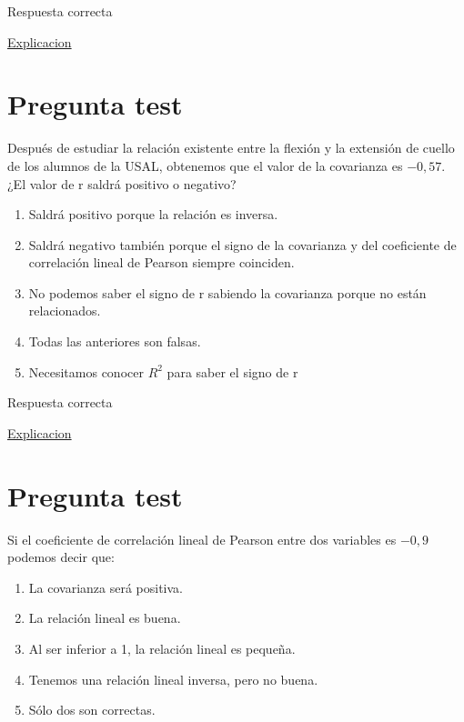 \documentclass[
]{book}
\providecommand{\tightlist}{%
  \setlength{\itemsep}{0pt}\setlength{\parskip}{0pt}}
\begin{document}
Respuesta correcta

\href{https://es.cochrane.org/es/divulgacion/pensamiento-critico/correlacion-no-implica-causalidad}{Explicacion}

\hypertarget{pregunta-test-125}{%
\section{Pregunta test}\label{pregunta-test-125}}

Después de estudiar la relación existente entre la flexión y la extensión de cuello de los alumnos de la USAL, obtenemos que el valor de la covarianza es \(-0,57\). ¿El valor de r saldrá positivo o negativo?

\begin{enumerate}
\def\labelenumi{\alph{enumi})}
\tightlist
\item
  Saldrá positivo porque la relación es inversa.
\item
  Saldrá negativo también porque el signo de la covarianza y del coeficiente de correlación lineal de Pearson siempre coinciden.
\item
  No podemos saber el signo de r sabiendo la covarianza porque no están relacionados.
\item
  Todas las anteriores son falsas.
\item
  Necesitamos conocer \(R^2\) para saber el signo de r
\end{enumerate}

Respuesta correcta

\href{https://1fjmanzano.github.io/bioestadistica/relaci\%C3\%B3n-entre-variables-nume\%CC\%81ricas.html\#covarianza}{Explicacion}

\hypertarget{pregunta-test-126}{%
\section{Pregunta test}\label{pregunta-test-126}}

Si el coeficiente de correlación lineal de Pearson entre dos variables es \(-0,9\) podemos decir que:

\begin{enumerate}
\def\labelenumi{\alph{enumi})}
\tightlist
\item
  La covarianza será positiva.
\item
  La relación lineal es buena.
\item
  Al ser inferior a 1, la relación lineal es pequeña.
\item
  Tenemos una relación lineal inversa, pero no buena.
\item
  Sólo dos son correctas.
\end{enumerate}
\end{document}
